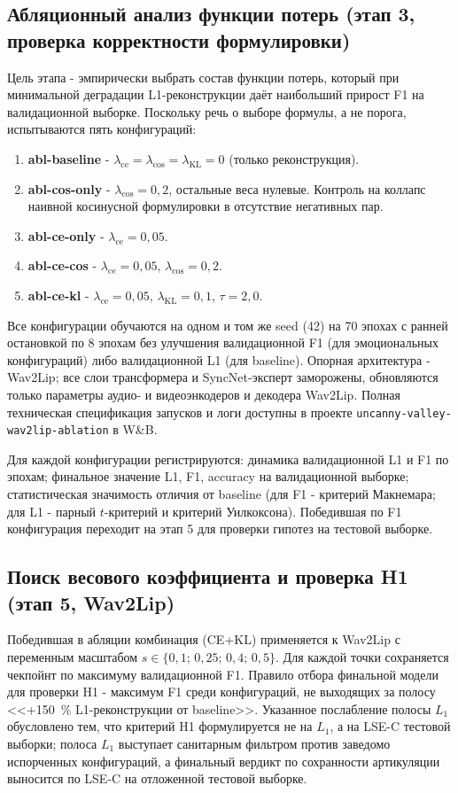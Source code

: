 \documentclass[a4paper, 12pt, oneside, openany]{article}
\begin{document}
\subsection{Абляционный анализ функции потерь (этап 3, проверка корректности формулировки)}

Цель этапа - эмпирически выбрать состав функции потерь, который при минимальной деградации L1-реконструкции даёт наибольший прирост F1 на валидационной выборке. Поскольку речь о выборе формулы, а не порога, испытываются пять конфигураций:
\begin{enumerate}
\item \textbf{abl-baseline} - $\lambda_{\text{ce}}=\lambda_{\cos}=\lambda_{\text{KL}}=0$ (только реконструкция).
\item \textbf{abl-cos-only} - $\lambda_{\cos}=0{,}2$, остальные веса нулевые. Контроль на коллапс наивной косинусной формулировки в отсутствие негативных пар.
\item \textbf{abl-ce-only} - $\lambda_{\text{ce}}=0{,}05$.
\item \textbf{abl-ce-cos} - $\lambda_{\text{ce}}=0{,}05$, $\lambda_{\cos}=0{,}2$.
\item \textbf{abl-ce-kl} - $\lambda_{\text{ce}}=0{,}05$, $\lambda_{\text{KL}}=0{,}1$, $\tau=2{,}0$.
\end{enumerate}

Все конфигурации обучаются на одном и том же seed (42) на 70 эпохах с ранней остановкой по 8 эпохам без улучшения валидационной F1 (для эмоциональных конфигураций) либо валидационной L1 (для baseline). Опорная архитектура - Wav2Lip; все слои трансформера и SyncNet-эксперт заморожены, обновляются только параметры аудио- и видеоэнкодеров и декодера Wav2Lip. Полная техническая спецификация запусков и логи доступны в проекте \texttt{uncanny-valley-wav2lip-ablation} в W\&B.

Для каждой конфигурации регистрируются: динамика валидационной L1 и F1 по эпохам; финальное значение L1, F1, accuracy на валидационной выборке; статистическая значимость отличия от baseline (для F1 - критерий Макнемара; для L1 - парный $t$-критерий и критерий Уилкоксона). Победившая по F1 конфигурация переходит на этап 5 для проверки гипотез на тестовой выборке.

\subsection{Поиск весового коэффициента и проверка H1 (этап 5, Wav2Lip)}

Победившая в абляции комбинация (CE+KL) применяется к Wav2Lip с переменным масштабом $s\in\{0{,}1;\,0{,}25;\,0{,}4;\,0{,}5\}$. Для каждой точки сохраняется чекпойнт по максимуму валидационной F1. Правило отбора финальной модели для проверки H1 - максимум F1 среди конфигураций, не выходящих за полосу <<+150~\% L1-реконструкции от baseline>>. Указанное послабление полосы $L_1$ обусловлено тем, что критерий H1 формулируется не на $L_1$, а на LSE-C тестовой выборки; полоса $L_1$ выступает санитарным фильтром против заведомо испорченных конфигураций, а финальный вердикт по сохранности артикуляции выносится по LSE-C на отложенной тестовой выборке.
\end{document}
